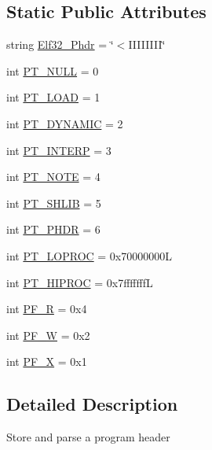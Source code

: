\subsection*{Static Public Attributes}
\begin{DoxyCompactItemize}
\item 
string \hyperlink{clasself_1_1_e_l_f_program_header_a94b4be5d3684e71b202269cec0e9b506}{Elf32\+\_\+\+Phdr} = \char`\"{}$<$I\+I\+I\+I\+I\+I\+II\char`\"{}
\item 
int \hyperlink{clasself_1_1_e_l_f_program_header_ad6e1767d66ead863f5787dd6a0a6ae18}{P\+T\+\_\+\+N\+U\+LL} = 0
\item 
int \hyperlink{clasself_1_1_e_l_f_program_header_a7742cb114db8473ab9699d8637c9cc5c}{P\+T\+\_\+\+L\+O\+AD} = 1
\item 
int \hyperlink{clasself_1_1_e_l_f_program_header_a0a20c63feed45745226427faa07b048f}{P\+T\+\_\+\+D\+Y\+N\+A\+M\+IC} = 2
\item 
int \hyperlink{clasself_1_1_e_l_f_program_header_a8b75255d767916a089e666da9e9c76f9}{P\+T\+\_\+\+I\+N\+T\+E\+RP} = 3
\item 
int \hyperlink{clasself_1_1_e_l_f_program_header_a826845f09b4727ebacd01389ced03481}{P\+T\+\_\+\+N\+O\+TE} = 4
\item 
int \hyperlink{clasself_1_1_e_l_f_program_header_a5762e86e5efc83d5c128266d4061d882}{P\+T\+\_\+\+S\+H\+L\+IB} = 5
\item 
int \hyperlink{clasself_1_1_e_l_f_program_header_a0d8b894ae2168e47ed4d9aaae3e7a018}{P\+T\+\_\+\+P\+H\+DR} = 6
\item 
int \hyperlink{clasself_1_1_e_l_f_program_header_ae9426efb84c8121d48f15598746b55c6}{P\+T\+\_\+\+L\+O\+P\+R\+OC} = 0x70000000L
\item 
int \hyperlink{clasself_1_1_e_l_f_program_header_a6495f2be7c4036a6afc89040951d067e}{P\+T\+\_\+\+H\+I\+P\+R\+OC} = 0x7fffffffL
\item 
int \hyperlink{clasself_1_1_e_l_f_program_header_a1cd8016f16ba799086d2a4ed814b4a50}{P\+F\+\_\+R} = 0x4
\item 
int \hyperlink{clasself_1_1_e_l_f_program_header_ab14b4ed7174421e3b042ae8039b0adbd}{P\+F\+\_\+W} = 0x2
\item 
int \hyperlink{clasself_1_1_e_l_f_program_header_afef877425f1c30b84e0753e869f9daa4}{P\+F\+\_\+X} = 0x1
\end{DoxyCompactItemize}


\subsection{Detailed Description}
\begin{DoxyVerb}Store and parse a program header\end{DoxyVerb}
 

